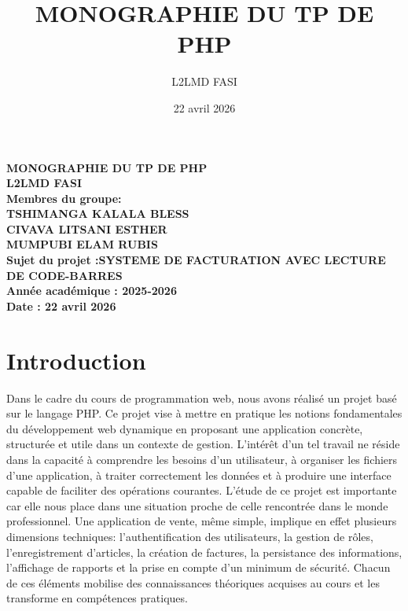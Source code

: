 \documentclass[12pt,a4paper]{article}
\title{MONOGRAPHIE DU TP DE PHP}
\author{L2LMD FASI}
\date{22 avril 2026}
\begin{document}
\thispagestyle{empty}
\begin{center}
\vspace*{\fill}
\textbf{MONOGRAPHIE DU TP DE PHP} \\
\vspace{0.8cm}
\textbf{L2LMD FASI} \\
\vspace{1.5cm}
\textbf{Membres du groupe:} \\
\vspace{0.7cm}
\textbf{TSHIMANGA KALALA BLESS } \\
\vspace{1cm}
\textbf{CIVAVA LITSANI ESTHER} \\
\vspace{1cm}
\textbf{MUMPUBI ELAM RUBIS} \\
\vspace{1.5cm}
\textbf{Sujet du projet :SYSTEME DE FACTURATION  AVEC LECTURE DE CODE-BARRES} \\
\vspace{1.5cm}
\textbf{Année académique : 2025-2026} \\
\vspace{0.5cm}
\textbf{Date : 22 avril 2026}
\vspace*{\fill}

\end{center}
\newpage
\tableofcontents
\newpage


\section{Introduction }

Dans le cadre du cours de programmation web, nous avons réalisé un projet basé sur le langage PHP. Ce projet vise à mettre en pratique les notions fondamentales du développement web dynamique en proposant une application concrète, structurée et utile dans un contexte de gestion. L'intérêt d'un tel travail ne réside dans la capacité à comprendre les besoins d'un utilisateur, à organiser les fichiers d'une application, à traiter correctement les données et à produire une interface capable de faciliter des opérations courantes.
L'étude de ce projet est importante car elle nous place dans une situation proche de celle rencontrée dans le monde professionnel. Une application de vente, même simple, implique en effet plusieurs dimensions techniques: l'authentification des utilisateurs, la gestion de rôles, l'enregistrement d'articles, la création de factures, la persistance des informations, l'affichage de rapports et la prise en compte d'un minimum de sécurité. Chacun de ces éléments mobilise des connaissances théoriques acquises au cours et les transforme en compétences pratiques.
\end{document}

